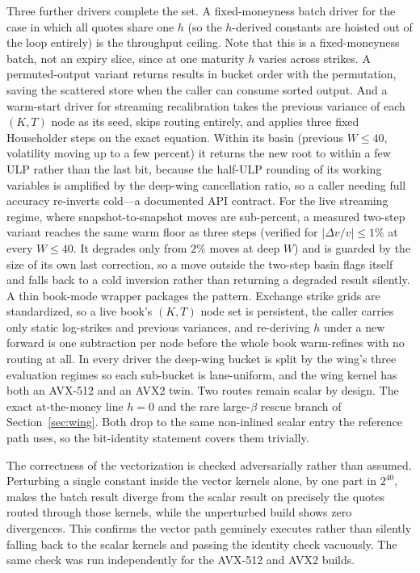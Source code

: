\documentclass[11pt]{article}
\begin{document}
Three further drivers complete the set. A fixed-moneyness batch driver for the case in which all quotes share one $h$ (so the $h$-derived constants are hoisted out of the loop entirely) is the throughput ceiling. Note that this is a fixed-moneyness batch, not an expiry slice, since at one maturity $h$ varies across strikes. A permuted-output variant returns results in bucket order with the permutation, saving the scattered store when the caller can consume sorted output. And a warm-start driver for streaming recalibration takes the previous variance of each $(K,T)$ node as its seed, skips routing entirely, and applies three fixed Householder steps on the exact equation. Within its basin (previous $W\le40$, volatility moving up to a few percent) it returns the new root to within a few ULP rather than the last bit, because the half-ULP rounding of its working variables is amplified by the deep-wing cancellation ratio, so a caller needing full accuracy re-inverts cold---a documented API contract. For the live streaming regime, where snapshot-to-snapshot moves are sub-percent, a measured two-step variant reaches the same warm floor as three steps (verified for $|\Delta v/v|\le1\%$ at every $W\le40$. It degrades only from $2\%$ moves at deep $W$) and is guarded by the size of its own last correction, so a move outside the two-step basin flags itself and falls back to a cold inversion rather than returning a degraded result silently. A thin book-mode wrapper packages the pattern. Exchange strike grids are standardized, so a live book's $(K,T)$ node set is persistent, the caller carries only static log-strikes and previous variances, and re-deriving $h$ under a new forward is one subtraction per node before the whole book warm-refines with no routing at all. In every driver the deep-wing bucket is split by the wing's three evaluation regimes so each sub-bucket is lane-uniform, and the wing kernel has both an AVX-512 and an AVX2 twin. Two routes remain scalar by design. The exact at-the-money line $h=0$ and the rare large-$\beta$ rescue branch of Section~\ref{sec:wing}. Both drop to the same non-inlined scalar entry the reference path uses, so the bit-identity statement covers them trivially.

The correctness of the vectorization is checked adversarially rather than assumed. Perturbing a single constant inside the vector kernels alone, by one part in $2^{40}$, makes the batch result diverge from the scalar result on precisely the quotes routed through those kernels, while the unperturbed build shows zero divergences. This confirms the vector path genuinely executes rather than silently falling back to the scalar kernels and passing the identity check vacuously. The same check was run independently for the AVX-512 and AVX2 builds.
\end{document}
